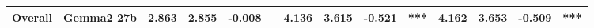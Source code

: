 \begin{table*}[t]
\begin{tabular}{c@{\kern2mm}c@{\kern2mm}ccr@{\kern-4mm}lccr@{\kern-4mm}lccr@{\kern-4mm}l}
\multirow{-6}{*}{\textbf{Overall}} & \textbf{Gemma2 27b} & 2.863 & 2.855 & \cellcolor[HTML]{FEFEFD}-0.008\hspace{4mm} & \multicolumn{1}{l}{} & 4.136 & 3.615 & \cellcolor[HTML]{F2BEB9}-0.521\hspace{4mm} & *** & 4.162 & 3.653 & \cellcolor[HTML]{F2BFBB}-0.509\hspace{4mm} & *** \\ \bottomrule
\end{tabular}
\vspace{-.5pc}
\caption{Mean squared error (MSE~$\downarrow$) by length for GPT-4o, Llama3 (8b, 70b, 405b), and Gemma2 (9b, 27b) models. Statistical significance notations and color coding follow the same conventions as in Table~\ref{tab:new-mse-results}.}
\vspace{-1pc}
\label{tab:new-mse-results}
\end{table*}

